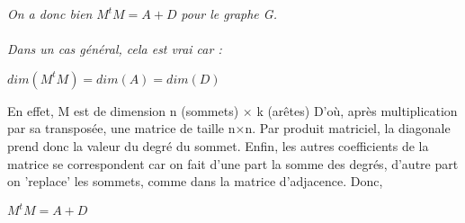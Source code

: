 \documentclass{article}
\begin{document}
	\textit{On a donc bien }$ M^tM = A+D $\textit{ pour le graphe G.}\\\\
	\textit{Dans un cas général, cela est vrai car :}
\begin{center}
	$
	dim(M^tM) = dim(A) = dim(D)
	$
\end{center}
	\textsf{En effet, M est de dimension n (sommets)} $\times$ \textsf{k (arêtes)}
	\linebreak
	\textsf{D'où, après multiplication par sa transposée, une matrice de taille n}$\times$\textsf{n.}
	\linebreak
	\textsf{Par produit matriciel, la diagonale prend donc la valeur du degré du sommet.}
	\linebreak
	\textsf{Enfin, les autres coefficients de la matrice se correspondent car on fait d'une part la somme des degrés, d'autre part on 'replace' les sommets, comme dans la matrice d'adjacence.}
	\linebreak
	\textsf{Donc,}
	\linebreak
\begin{center}
	$
	M^tM = A + D
	$
\end{center}
\end{document}

